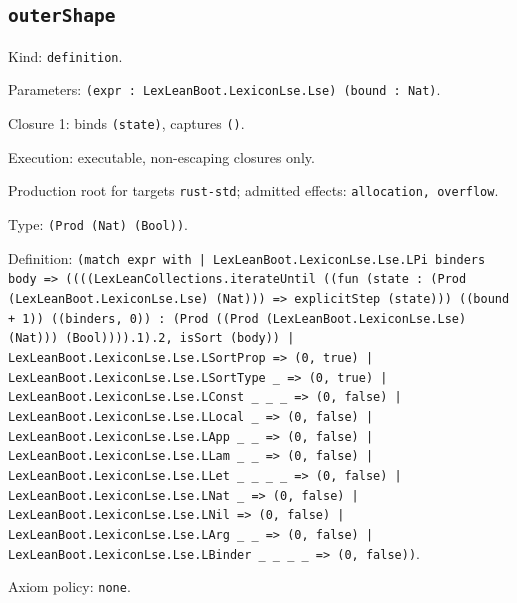 \documentclass[11pt]{article}
\begin{document}
\subsection*{\texttt{outerShape}}
\noindent Kind: \texttt{definition}.\par
\noindent Parameters: \texttt{(expr : LexLeanBoot.LexiconLse.Lse) (bound : Nat)}.\par
\noindent Closure 1: binds \texttt{(state)}, captures \texttt{()}.\par
\noindent Execution: executable, non-escaping closures only.\par
\noindent Production root for targets \texttt{rust-std}; admitted effects: \texttt{allocation, overflow}.\par
\noindent Type: \texttt{(Prod (Nat) (Bool))}.\par
\noindent Definition: \texttt{(match expr with | LexLeanBoot.LexiconLse.Lse.LPi binders body => ((((LexLeanCollections.iterateUntil ((fun (state : (Prod (LexLeanBoot.LexiconLse.Lse) (Nat))) => explicitStep (state))) ((bound + 1)) ((binders, 0)) : (Prod ((Prod (LexLeanBoot.LexiconLse.Lse) (Nat))) (Bool)))).1).2, isSort (body)) | LexLeanBoot.LexiconLse.Lse.LSortProp => (0, true) | LexLeanBoot.LexiconLse.Lse.LSortType \_ => (0, true) | LexLeanBoot.LexiconLse.Lse.LConst \_ \_ \_ => (0, false) | LexLeanBoot.LexiconLse.Lse.LLocal \_ => (0, false) | LexLeanBoot.LexiconLse.Lse.LApp \_ \_ => (0, false) | LexLeanBoot.LexiconLse.Lse.LLam \_ \_ => (0, false) | LexLeanBoot.LexiconLse.Lse.LLet \_ \_ \_ \_ => (0, false) | LexLeanBoot.LexiconLse.Lse.LNat \_ => (0, false) | LexLeanBoot.LexiconLse.Lse.LNil => (0, false) | LexLeanBoot.LexiconLse.Lse.LArg \_ \_ => (0, false) | LexLeanBoot.LexiconLse.Lse.LBinder \_ \_ \_ \_ => (0, false))}.\par
\noindent Axiom policy: \texttt{none}.\par
\end{document}
